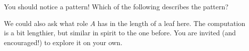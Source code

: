 \documentclass{ximera}
\begin{document}
\begin{exercise}
\begin{exercise}
\begin{exercise}
You should notice a pattern! Which of the following describes the pattern?
\begin{multipleChoice}
\end{multipleChoice}
\end{exercise}

We could also ask what role $A$ has in the length of a leaf here.  The computation is a bit lengthier, but similar in spirit to the one before.  You are invited (and encouraged!) to explore it on your own.

\end{exercise}
\end{exercise}
\end{document}
